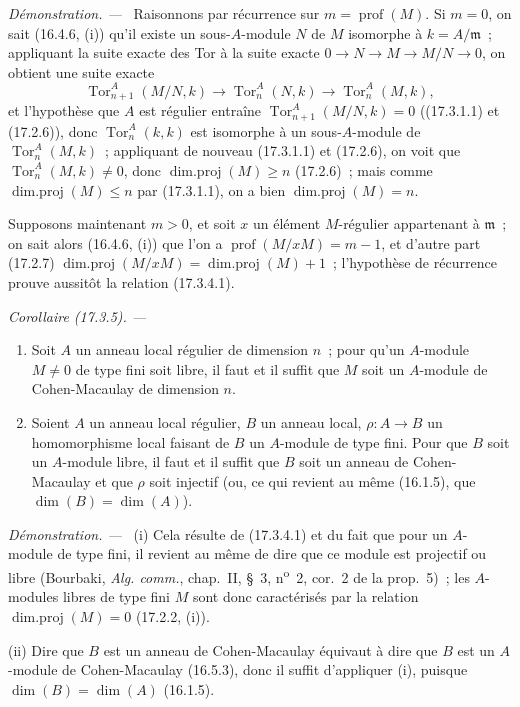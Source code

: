 \documentclass[10pt,oneside]{book}
\makeatletter
\newcommand{\setmanualcurrentlabel}[1]{\def\@currentlabel{#1}}
\newcommand{\oldpage}[2][]{%
  \setcounter{footnote}{0}%
  \marginpar{\scriptsize\textbf{#1}~|~#2}\ignorespaces}
\newenvironment{corollary}[1][]{%
  \setmanualcurrentlabel{#1}\par\medskip\noindent\itshape Corollaire (#1). ---\ }{\par}
\newenvironment{proof}{%
  \par\medskip\noindent\textit{Démonstration. ---\ }}{\par}
\makeatother
\begin{document}
\begin{proof}
Raisonnons par récurrence sur $m=\operatorname{prof}(M)$. Si $m=0$, on sait
(16.4.6, (i)) qu'il existe un sous-$A$-module $N$ de $M$ isomorphe à
$k=A/\mathfrak{m}$~; appliquant la suite exacte des Tor à la suite exacte
$0\longrightarrow N\longrightarrow M\longrightarrow M/N\longrightarrow0$,
on obtient une suite exacte
\[
  \operatorname{Tor}^A_{n+1}(M/N,k)\longrightarrow
  \operatorname{Tor}^A_n(N,k)\longrightarrow
  \operatorname{Tor}^A_n(M,k),
\]
et l'hypothèse que $A$ est régulier entraîne
$\operatorname{Tor}^A_{n+1}(M/N,k)=0$ ((17.3.1.1) et (17.2.6)), donc
$\operatorname{Tor}^A_n(k,k)$ est isomorphe à un sous-$A$-module de
$\operatorname{Tor}^A_n(M,k)$~; appliquant de nouveau (17.3.1.1) et (17.2.6),
on voit que $\operatorname{Tor}^A_n(M,k)\neq0$, donc
$\operatorname{dim.proj}(M)\geq n$ (17.2.6)~; mais comme
$\operatorname{dim.proj}(M)\leq n$ par (17.3.1.1), on a bien
$\operatorname{dim.proj}(M)=n$.

Supposons maintenant $m>0$, et soit $x$ un élément $M$-régulier appartenant à
$\mathfrak{m}$~; on sait alors (16.4.6, (i)) que l'on a
$\operatorname{prof}(M/xM)=m-1$, et d'autre part (17.2.7)
$\operatorname{dim.proj}(M/xM)=\operatorname{dim.proj}(M)+1$~; l'hypothèse de
récurrence prouve aussitôt la relation (17.3.4.1).
\end{proof}

\oldpage[0\textsubscript{IV-1}]{50}

\begin{corollary}[17.3.5]
\label{0.17.3.5-fr}
\begin{enumerate}
  \item[\rm(i)] Soit $A$ un anneau local régulier de dimension $n$~; pour
  qu'un $A$-module $M\neq0$ de type fini soit libre, il faut et il suffit que
  $M$ soit un $A$-module de Cohen-Macaulay de dimension $n$.
  \item[\rm(ii)] Soient $A$ un anneau local régulier, $B$ un anneau local,
  $\rho:A\to B$ un homomorphisme local faisant de $B$ un $A$-module de type
  fini. Pour que $B$ soit un $A$-module libre, il faut et il suffit que $B$
  soit un anneau de Cohen-Macaulay et que $\rho$ soit injectif (ou, ce qui
  revient au même (16.1.5), que $\dim(B)=\dim(A)$).
\end{enumerate}
\end{corollary}

\begin{proof}
(i) Cela résulte de (17.3.4.1) et du fait que pour un $A$-module de type fini,
il revient au même de dire que ce module est projectif ou libre (Bourbaki,
\emph{Alg. comm.}, chap.~II, \S~3, n\textsuperscript{o}~2, cor.~2 de la
prop.~5)~; les $A$-modules libres de type fini $M$ sont donc caractérisés par
la relation $\operatorname{dim.proj}(M)=0$ (17.2.2, (i)).

(ii) Dire que $B$ est un anneau de Cohen-Macaulay équivaut à dire que $B$ est
un $A$-module de Cohen-Macaulay (16.5.3), donc il suffit d'appliquer (i),
puisque $\dim(B)=\dim(A)$ (16.1.5).
\end{proof}
\end{document}
